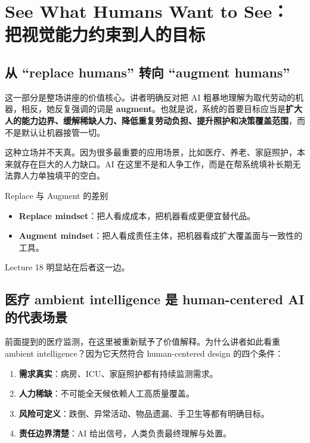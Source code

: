 \section{See What Humans Want to See：把视觉能力约束到人的目标}

\subsection{从 ``replace humans'' 转向 ``augment humans''}

这一部分是整场讲座的价值核心。讲者明确反对把 AI 粗暴地理解为取代劳动的机器，相反，她反复强调的词是 \textbf{augment}。也就是说，系统的首要目标应当是\textbf{扩大人的能力边界、缓解稀缺人力、降低重复劳动负担、提升照护和决策覆盖范围}，而不是默认让机器接管一切。

这种立场并不天真。因为很多最重要的应用场景，比如医疗、养老、家庭照护，本来就存在巨大的人力缺口。AI 在这里不是和人争工作，而是在帮系统填补长期无法靠人力单独填平的空白。

\begin{importantbox}{Replace 与 Augment 的差别}
\begin{itemize}
    \item \textbf{Replace mindset}：把人看成成本，把机器看成更便宜替代品。
    \item \textbf{Augment mindset}：把人看成责任主体，把机器看成扩大覆盖面与一致性的工具。
\end{itemize}
Lecture 18 明显站在后者这一边。
\end{importantbox}

\subsection{医疗 ambient intelligence 是 human-centered AI 的代表场景}

前面提到的医疗监测，在这里被重新赋予了价值解释。为什么讲者如此看重 ambient intelligence？因为它天然符合 human-centered design 的四个条件：

\begin{enumerate}
    \item \textbf{需求真实}：病房、ICU、家庭照护都有持续监测需求。
    \item \textbf{人力稀缺}：不可能全天候依赖人工高质量覆盖。
    \item \textbf{风险可定义}：跌倒、异常活动、物品遗漏、手卫生等都有明确目标。
    \item \textbf{责任边界清楚}：AI 给出信号，人类负责最终理解与处置。
\end{enumerate}

